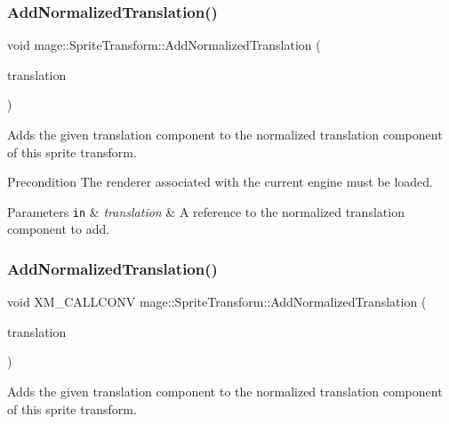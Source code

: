 \subsubsection{\texorpdfstring{Add\+Normalized\+Translation()}{AddNormalizedTranslation()}\hspace{0.1cm}{\footnotesize\ttfamily [2/3]}}
{\footnotesize\ttfamily void mage\+::\+Sprite\+Transform\+::\+Add\+Normalized\+Translation (\begin{DoxyParamCaption}\item[{const X\+M\+F\+L\+O\+A\+T2 \&}]{translation }\end{DoxyParamCaption})}

Adds the given translation component to the normalized translation component of this sprite transform.

\begin{DoxyPrecond}{Precondition}
The renderer associated with the current engine must be loaded. 
\end{DoxyPrecond}

\begin{DoxyParams}[1]{Parameters}
\mbox{\tt in}  & {\em translation} & A reference to the normalized translation component to add. \\
\hline
\end{DoxyParams}
\hypertarget{structmage_1_1_sprite_transform_a167f79e773eeb4dca46915f748726113}{}\label{structmage_1_1_sprite_transform_a167f79e773eeb4dca46915f748726113} 
\subsubsection{\texorpdfstring{Add\+Normalized\+Translation()}{AddNormalizedTranslation()}\hspace{0.1cm}{\footnotesize\ttfamily [3/3]}}
{\footnotesize\ttfamily void X\+M\+\_\+\+C\+A\+L\+L\+C\+O\+NV mage\+::\+Sprite\+Transform\+::\+Add\+Normalized\+Translation (\begin{DoxyParamCaption}\item[{F\+X\+M\+V\+E\+C\+T\+OR}]{translation }\end{DoxyParamCaption})}

Adds the given translation component to the normalized translation component of this sprite transform.

